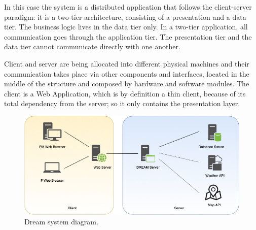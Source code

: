 In this case the system is a distributed application that follows the client-server paradigm: it is a two-tier architecture, consisting of a presentation and a data tier. 
The business logic lives in the data tier only.
In a two-tier application, all communication goes through the application tier. The presentation tier and the data tier cannot communicate directly with one another. 

Client and server are being allocated into different physical machines and their communication takes place via other components and interfaces, located in the middle of the structure and composed by hardware and software modules. 
The client is a Web Application, which is by definition a thin client, because of its total dependency from the server; so it only contains the presentation layer.

\begin{figure}[H]
    \begin{center}
    \includegraphics[width=1.2\textwidth]{images/System diagram.png}
    \caption{Dream system diagram.}
    \label{fig:system diagram}
    \end{center}
\end{figure}

